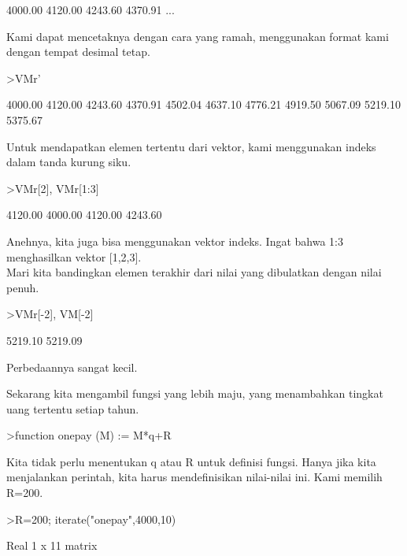 \documentclass[a4paper,10pt]{article}
\begin{document}
\begin{eulernotebook}
\begin{eulercomment}
\begin{eulercomment}
\begin{eulercomment}
\begin{eulercomment}
\begin{euleroutput}
      4000.00     4120.00     4243.60     4370.91     ...
\end{euleroutput}
\begin{eulercomment}
Kami dapat mencetaknya dengan cara yang ramah, menggunakan format kami
dengan tempat desimal tetap.
\end{eulercomment}
\begin{eulerprompt}
>VMr'
\end{eulerprompt}
\begin{euleroutput}
      4000.00 
      4120.00 
      4243.60 
      4370.91 
      4502.04 
      4637.10 
      4776.21 
      4919.50 
      5067.09 
      5219.10 
      5375.67 
\end{euleroutput}
\begin{eulercomment}
Untuk mendapatkan elemen tertentu dari vektor, kami menggunakan indeks
dalam tanda kurung siku.
\end{eulercomment}
\begin{eulerprompt}
>VMr[2], VMr[1:3]
\end{eulerprompt}
\begin{euleroutput}
      4120.00 
      4000.00     4120.00     4243.60 
\end{euleroutput}
\begin{eulercomment}
Anehnya, kita juga bisa menggunakan vektor indeks. Ingat bahwa 1:3
menghasilkan vektor [1,2,3].\\
Mari kita bandingkan elemen terakhir dari nilai yang dibulatkan dengan
nilai penuh.
\end{eulercomment}
\begin{eulerprompt}
>VMr[-2], VM[-2]
\end{eulerprompt}
\begin{euleroutput}
      5219.10 
      5219.09 
\end{euleroutput}
\begin{eulercomment}
Perbedaannya sangat kecil.

\end{eulercomment}
\begin{eulercomment}
Sekarang kita mengambil fungsi yang lebih maju, yang menambahkan
tingkat uang tertentu setiap tahun.
\end{eulercomment}
\begin{eulerprompt}
>function onepay (M) := M*q+R
\end{eulerprompt}
\begin{eulercomment}
Kita tidak perlu menentukan q atau R untuk definisi fungsi. Hanya jika
kita menjalankan perintah, kita harus mendefinisikan nilai-nilai ini.
Kami memilih R=200.
\end{eulercomment}
\begin{eulerprompt}
>R=200; iterate("onepay",4000,10)
\end{eulerprompt}
\begin{euleroutput}
  Real 1 x 11 matrix
  

\end{euleroutput}
\end{eulercomment}
\end{eulercomment}
\end{eulercomment}
\end{eulercomment}
\end{eulernotebook}
\end{document}
